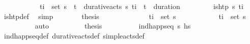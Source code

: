 \begin{isabellebody}
%
\isadelimproof
\ \ %
\endisadelimproof
%
\isatagproof
{}\isamarkupfalse%
\ {\isacharminus}{\kern0pt}\isanewline
\ \ \ \ \isamarkupfalse%
\ {\isachardoublequoteopen}{\isacharparenleft}{\kern0pt}{\isasymexists}{\isasympi}{\isachardot}{\kern0pt}\ {\isacharparenleft}{\kern0pt}t\isactrlsub i{\isacharcomma}{\kern0pt}{\isasympi}{\isacharparenright}{\kern0pt}\ {\isasymin}\ set\ {\isasympi}s{\isacharparenright}{\kern0pt}\ {\isasymor}\ {\isacharparenleft}{\kern0pt}{\isasymexists}{\isacharparenleft}{\kern0pt}t\isactrlsub {\isasympi}{\isacharcomma}{\kern0pt}{\isasympi}{\isacharparenright}{\kern0pt}\ {\isasymin}\ durative{\isacharunderscore}{\kern0pt}acts\ {\isasympi}s{\isachardot}{\kern0pt}\ t\isactrlsub i\ {\isacharequal}{\kern0pt}\ t\isactrlsub {\isasympi}\ {\isacharplus}{\kern0pt}\ {\isacharparenleft}{\kern0pt}duration\ {\isasympi}{\isacharparenright}{\kern0pt}{\isacharparenright}{\kern0pt}{\isachardoublequoteclose}\isanewline
\ \ \ \ \ \ \isamarkupfalse%
\ {\isacartoucheopen}is{\isacharunderscore}{\kern0pt}htp\ {\isasympi}s\ t\isactrlsub i{\isacartoucheclose}\ \isamarkupfalse%
\ is{\isacharunderscore}{\kern0pt}htp{\isacharunderscore}{\kern0pt}def\ \isamarkupfalse%
\ simp\isanewline
\ \ \ \ \isamarkupfalse%
\ \isamarkupfalse%
\ {\isacharquery}{\kern0pt}thesis\isanewline
\ \ \ \ \isamarkupfalse%
\isanewline
\ \ \ \ \ \ \isamarkupfalse%
\ {\isachardoublequoteopen}{\isasymexists}{\isasympi}{\isachardot}{\kern0pt}\ {\isacharparenleft}{\kern0pt}t\isactrlsub i{\isacharcomma}{\kern0pt}{\isasympi}{\isacharparenright}{\kern0pt}\ {\isasymin}\ set\ {\isasympi}s{\isachardoublequoteclose}\isanewline
\ \ \ \ \ \ \isamarkupfalse%
\ \isamarkupfalse%
\ {\isasympi}\ \ {\isachardoublequoteopen}{\isacharparenleft}{\kern0pt}t\isactrlsub i{\isacharcomma}{\kern0pt}{\isasympi}{\isacharparenright}{\kern0pt}\ {\isasymin}\ set\ {\isasympi}s{\isachardoublequoteclose}\isanewline
\ \ \ \ \ \ \ \ \isamarkupfalse%
\ auto\isanewline
\ \ \ \ \ \ \isamarkupfalse%
\ \isamarkupfalse%
\ {\isacharquery}{\kern0pt}thesis\isanewline
\ \ \ \ \ \ \ \ \isamarkupfalse%
\ {\isacartoucheopen}ind{\isacharunderscore}{\kern0pt}happ{\isacharunderscore}{\kern0pt}seq\ {\isasympi}s\ hs{\isacartoucheclose}\isanewline
\ \ \ \ \ \ \ \ \isamarkupfalse%
\ ind{\isacharunderscore}{\kern0pt}happ{\isacharunderscore}{\kern0pt}seq{\isacharunderscore}{\kern0pt}def\ durative{\isacharunderscore}{\kern0pt}acts{\isacharunderscore}{\kern0pt}def\ simple{\isacharunderscore}{\kern0pt}acts{\isacharunderscore}{\kern0pt}def\ \isanewline

\end{isabellebody}
